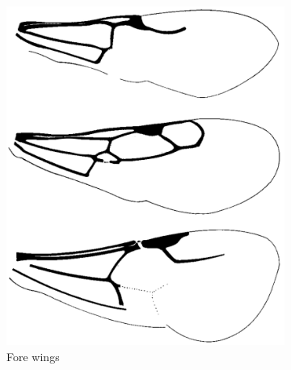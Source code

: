 \documentclass[letterpaper, 11pt]{article}
\begin{document}
\begin{figure}[ht!]
  \centering
\begin{subfigure}[ht!]{0.28\textwidth}
    \includegraphics[width=\textwidth]{BethylidWings}
  \caption{Fore wings \citep[][pg. 134]{goulet1993hymenoptera}}
  \label{fig:bethylid1}
\end{subfigure}
    \qquad
\begin{subfigure}[ht!]{0.35\textwidth}

\end{subfigure}
\end{figure}
\end{document}
